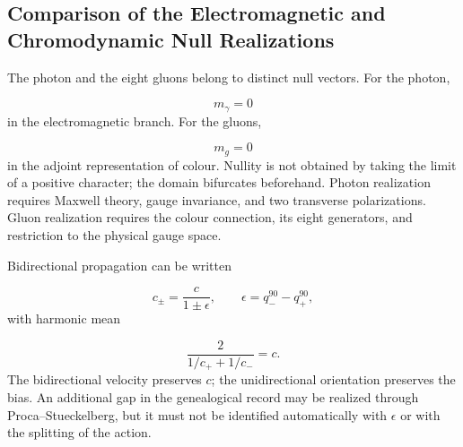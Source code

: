 
\subsection{Comparison of the Electromagnetic and Chromodynamic Null Realizations}
The photon and the eight gluons belong to distinct null vectors. For the photon,

\[
m_\gamma=0
\]
in the electromagnetic branch. For the gluons,

\[
m_g=0
\]
in the adjoint representation of colour. Nullity is not obtained by taking the limit of a positive character; the domain bifurcates beforehand. Photon realization requires Maxwell theory, gauge invariance, and two transverse polarizations. Gluon realization requires the colour connection, its eight generators, and restriction to the physical gauge space.

Bidirectional propagation can be written

\[
c_\pm=\frac{c}{1\pm\epsilon},
\qquad
\epsilon=q_-^{90}-q_+^{90},
\]
with harmonic mean

\[
\frac{2}{1/c_++1/c_-}=c.
\]
The bidirectional velocity preserves \(c\); the unidirectional orientation preserves the bias. An additional gap in the genealogical record may be realized through Proca--Stueckelberg, but it must not be identified automatically with \(\epsilon\) or with the splitting of the action.

